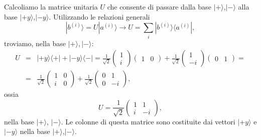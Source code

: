 \documentclass[a4paper,12pt,oneside]{book}
\begin{document}
Calcoliamo la matrice unitaria $U$ che consente di passare dalla base $| + \rangle $,$| - \rangle $ alla base $| +y \rangle $,$| -y \rangle$. Utilizzando le relazioni generali
		\begin{equation}
		\boxed{
			| b^{(i)}\rangle =U| a^{(i)} \rangle \rightarrow U = \sum \limits_i | b^{(i)}\rangle \langle a^{(i)}| ,
			}
	\end{equation}
troviamo, nella base $| + \rangle,| - \rangle$:
	\begin{eqnarray}
		U &=& | +y \rangle \langle + | + |-y \rangle \langle - |=
		\frac{1}{\sqrt{2}}
		\begin{pmatrix}
		1\\
		i
		\end{pmatrix}
		\begin{pmatrix}
		1 & 0
		\end{pmatrix}+
		\frac{1}{\sqrt{2}}
		\begin{pmatrix}
		1\\
		-i
		\end{pmatrix}
		\begin{pmatrix}
		0 & 1
		\end{pmatrix}= \nonumber \\
		&=&\frac{1}{\sqrt{2}}
		\begin{pmatrix}
		1 & 0\\
		i & 0
		\end{pmatrix}+
		\frac{1}{\sqrt{2}}
		\begin{pmatrix}
		0 & 1\\
		0 & -i
		\end{pmatrix} ,
	\end{eqnarray}
ossia
	\begin{equation}
		\boxed{
			U= \frac{1}{\sqrt{2}}
			\begin{pmatrix}
			1 & 1\\
			i & -i
			\end{pmatrix} ,
			}
	\end{equation}
nella base $| + \rangle $, $| - \rangle $. Le colonne di questa matrice sono costituite dai vettori $| +y \rangle $ e $| -y \rangle $ nella base $| + \rangle $,$| - \rangle $.\\
\end{document}
